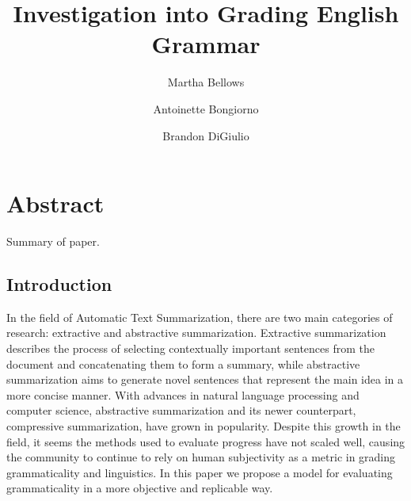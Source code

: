\documentclass[11pt,a4paper]{article}
\title{Investigation into Grading English Grammar}
\author{
        Martha Bellows 
\and
        Antoinette Bongiorno
\and 
	Brandon DiGiulio
}
\begin{document}
\maketitle

\section{Abstract}
Summary of paper. 

\pagebreak

\begin{multicols}{2}

\section{Introduction}
In the field of Automatic Text Summarization, there are two main categories of research: extractive and abstractive summarization. Extractive summarization describes the process of selecting contextually important sentences from the document and concatenating them to form a summary, while abstractive summarization aims to generate novel sentences that represent the main idea in a more concise manner. With advances in natural language processing and computer science, abstractive summarization and its newer counterpart, compressive summarization, have grown in popularity. Despite this growth in the field, it seems the methods used to evaluate progress have not scaled well, causing the community to continue to rely on human subjectivity as a metric in grading grammaticality and linguistics. In this paper we propose a model for evaluating grammaticality in a more objective and replicable way.



\end{multicols}
\end{document}
